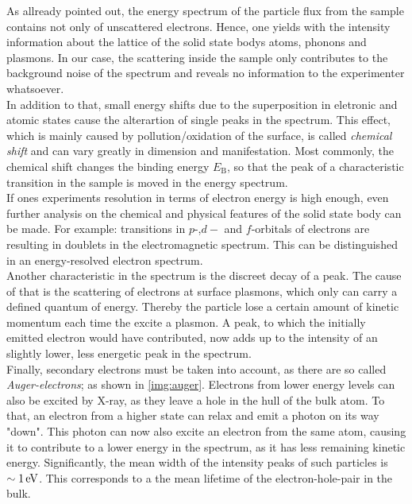 \documentclass[numbers=noenddot,a4paper]{article}
\newcommand{\ix}[1]{_\text{#1}}
\newcommand{\tilt}[1]{\textit{#1}}
\begin{document}
		As allready pointed out, the energy spectrum of the particle flux from the sample contains not only of unscattered electrons. Hence, one yields with the intensity information about the lattice of the solid state bodys atoms, phonons and plasmons. In our case, the scattering inside the sample only contributes to the background noise of the spectrum and reveals no information to the experimenter whatsoever.\\
		In addition to that, small energy shifts due to the superposition in eletronic and atomic states cause the alterartion of single peaks in the spectrum. This effect, which is mainly caused by pollution/oxidation of the surface, is called \tilt{chemical shift} and can vary greatly in dimension and manifestation. Most commonly, the chemical shift changes the binding energy $E\ix{B}$, so that the peak of a characteristic transition in the sample is moved in the energy spectrum.\\
		If ones experiments resolution in terms of electron energy is high enough, even further analysis on the chemical and physical features of the solid state body can be made. For example: transitions in $p$-,$d-$ and $f$-orbitals of electrons are resulting in doublets in the electromagnetic spectrum. This can be distinguished in an energy-resolved electron spectrum.\\
		Another characteristic in the spectrum is the discreet decay of a peak. The cause of that is the scattering of electrons at surface plasmons, which only can carry a defined quantum of energy. Thereby the particle lose a certain amount of kinetic momentum each time the excite a plasmon. A peak, to which the initially emitted electron would have contributed, now adds up to the intensity of an slightly lower, less energetic peak in the spectrum.\\
		Finally, secondary electrons must be taken into account, as there are so called \tilt{Auger-electrons}; as shown in \autoref{img:auger}. Electrons from lower energy levels can also be excited by X-ray, as they leave a hole in the hull of the bulk atom. To that, an electron from a higher state can relax and emit a photon on its way "down". This photon can now also excite an electron from the same atom, causing it to contribute to a lower energy in the spectrum, as it has less remaining kinetic energy. Significantly, the mean width of the intensity peaks of such particles is $\sim\unit[1]{eV}$. This corresponds to a the mean lifetime of the electron-hole-pair in the bulk.
\end{document}
